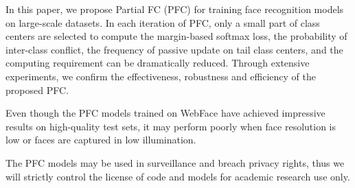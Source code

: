 \documentclass[10pt,twocolumn,letterpaper]{article}
\begin{document}
In this paper, we propose Partial FC (PFC) for training face recognition models on large-scale datasets. In each iteration of PFC, only a small part of class centers are selected to compute the margin-based softmax loss, the probability of inter-class conflict, the frequency of passive update on tail class centers, and the computing requirement can be dramatically reduced. Through extensive experiments, we confirm the effectiveness, robustness and efficiency of the proposed PFC. 

 Even though the PFC models trained on WebFace have achieved impressive results on high-quality test sets, it may perform poorly when face resolution is low or faces are captured in low illumination. 

 The PFC models may be used in surveillance and breach privacy rights, thus we will strictly control the license of code and models for academic research use only.


{\small


}
\end{document}
